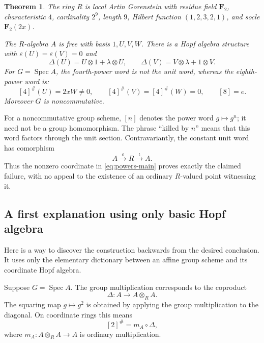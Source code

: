 \documentclass[11pt]{article}
\newtheorem{theorem}{Theorem}[section]
\theoremstyle{remark}
\newcommand{\F}{\mathbf F}
\newcommand{\Spec}{\operatorname{Spec}}
\newcommand{\eps}{\varepsilon}
\newcommand{\ot}{\otimes}
\begin{document}
\begin{theorem}\label{thm:main}
The ring $R$ is local Artin Gorenstein with residue field $\F_2$,
characteristic $4$, cardinality $2^9$, length $9$, Hilbert function
$(1,2,3,2,1)$, and socle $\F_2(2x)$.

The $R$-algebra $A$ is free with basis $1,U,V,W$.  There is a Hopf algebra
structure with $\eps(U)=\eps(V)=0$ and
\begin{equation}\label{eq:Delta}
 \Delta(U)=U\ot1+\lambda\ot U,
 \qquad
 \Delta(V)=V\ot\lambda+1\ot V.
\end{equation}
For $G=\Spec A$, the fourth-power word is not the unit word, whereas the
eighth-power word is:
\begin{equation}\label{eq:powers-main}
 [4]^\#(U)=2xW\ne0,
 \qquad [4]^\#(V)=[4]^\#(W)=0,
 \qquad [8]=e.
\end{equation}
Moreover $G$ is noncommutative.
\end{theorem}

For a noncommutative group scheme, $[n]$ denotes the power word
$g\mapsto g^n$; it need not be a group homomorphism.  The phrase ``killed by
$n$'' means that this word factors through the unit section.  Contravariantly,
the constant unit word has comorphism
\[
 A\xrightarrow{\eps}R\xrightarrow{\iota}A.
\]
Thus the nonzero coordinate in \eqref{eq:powers-main} proves exactly the
claimed failure, with no appeal to the existence of an ordinary $R$-valued
point witnessing it.

\subsection*{A first explanation using only basic Hopf algebra}

Here is a way to discover the construction backwards from the desired
conclusion.  It uses only the elementary dictionary between an affine group
scheme and its coordinate Hopf algebra.

Suppose $G=\Spec A$.  The group multiplication corresponds to the coproduct
\[
 \Delta:A\longrightarrow A\ot_R A.
\]
The squaring map $g\mapsto g^2$ is obtained by applying the group
multiplication to the diagonal.  On coordinate rings this means
\begin{equation}\label{eq:first-reading-square}
 [2]^\#=m_A\circ\Delta,
\end{equation}
where $m_A:A\ot_R A\to A$ is ordinary multiplication.
\end{document}
